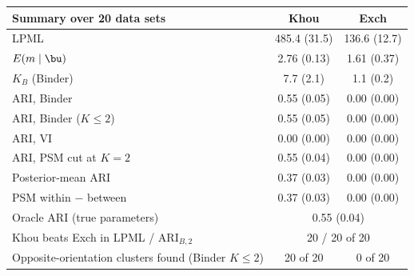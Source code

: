 \begin{tabular}{lcc}
\hline\hline
Summary over 20 data sets & Khou & Exch \\
\hline
LPML & 485.4 (31.5) & 136.6 (12.7) \\
$E(m\mid\bu)$ & 2.76 (0.13) & 1.61 (0.37) \\
$K_B$ (Binder) & 7.7 (2.1) & 1.1 (0.2) \\
ARI, Binder & 0.55 (0.05) & 0.00 (0.00) \\
ARI, Binder ($K\leq2$) & 0.55 (0.05) & 0.00 (0.00) \\
ARI, VI & 0.00 (0.00) & 0.00 (0.00) \\
ARI, PSM cut at $K=2$ & 0.55 (0.04) & 0.00 (0.00) \\
Posterior-mean ARI & 0.37 (0.03) & 0.00 (0.00) \\
PSM within $-$ between & 0.37 (0.03) & 0.00 (0.00) \\
Oracle ARI (true parameters) & \multicolumn{2}{c}{0.55 (0.04)} \\
Khou beats Exch in LPML / ARI$_{B,2}$ & \multicolumn{2}{c}{20 / 20 of 20} \\
Opposite-orientation clusters found (Binder $K\leq2$) & 20 of 20 & 0 of 20 \\
\hline\hline
\end{tabular}
